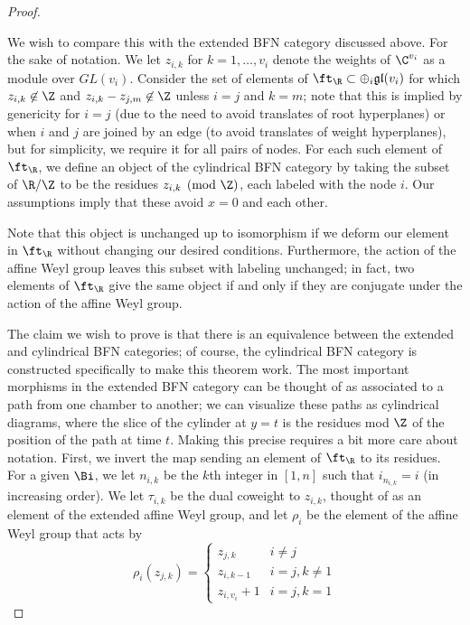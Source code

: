 \begin{proof}
\begin{itemize}
  \end{itemize}
  
  
We wish to compare this with the extended BFN category discussed above.  For the sake of notation.  We let $z_{i,k}$ for $k=1,\dots, v_i$ denote the weights of $\C^{v_i}$ as a module over
$GL(v_i)$.  Consider the set of elements of $\ft_{\R}\subset \oplus_i \mathfrak{gl}(v_i)$ for which $z_{i,k}\not\in \Z $ and  $z_{i,k}-z_{j,m}\not\in \Z$ unless $i=j$ and $k=m$; note that this is implied by genericity for $i=j$ (due to the need to avoid translates of root hyperplanes) or when $i$ and $j$ are joined by an edge (to avoid translates of weight hyperplanes), but for simplicity, we require it for all pairs of nodes.
For each such element of $\ft_{\R}$, we define an object of the cylindrical BFN category by taking the subset of $\R/\Z$ to be the residues $z_{i,k}\pmod \Z$, each labeled with the node $i$.  Our assumptions imply that these avoid $x=0$ and each other.  

Note that this object is unchanged up to isomorphism if we deform our element in $\ft_{\R}$ without changing our desired conditions.  Furthermore, the action of the affine Weyl group leaves this subset with labeling unchanged; in fact, two elements of $\ft_{\R}$ give the same object if and only if they are conjugate under the action of the affine Weyl group.  

The claim we wish to prove is that there is an equivalence between the extended and cylindrical BFN categories; of course, the cylindrical BFN category is constructed specifically to make this theorem work.  The most important morphisms in the extended BFN category can be thought of as associated to a path from one chamber to another; we can visualize these paths as cylindrical diagrams, where the slice of the cylinder at $y=t$ is the residues mod $\Z$ of the position of the path at time $t$. 
Making this precise requires a bit more care about notation.
First, we invert the map sending an element of $\ft_{\R}$ to its residues.  For a given $\Bi$, 
we let $n_{i,k}$ be the $k$th integer in $[1,n]$ such that
$i_{n_{i,k}}=i$ (in increasing order).    We let $\tau_{i,k}$ be the dual coweight to $z_{i,k}$, thought of as an
element of the extended affine Weyl group, and let $\rho_i$ be the element of the  affine Weyl group that acts by 
\begin{equation*}
    \rho_i(z_{j,k})=\begin{cases}
    z_{j,k} & i\neq j\\
    z_{i,k-1} & i=j, k\neq 1\\
    z_{i,v_i}+1 & i=j,k=1
    \end{cases}
\end{equation*}


\end{proof}
